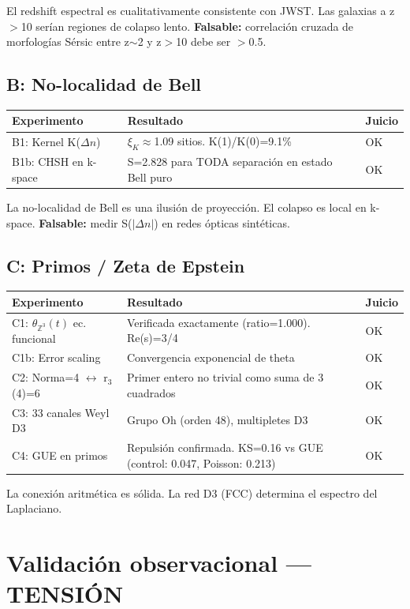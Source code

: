 \documentclass[12pt]{article}
\begin{document}
El redshift espectral es cualitativamente consistente con JWST. Las galaxias a z$>$10 serían regiones de colapso lento. \textbf{Falsable:} correlación cruzada de morfologías Sérsic entre z$\sim$2 y z$>$10 debe ser $>$0.5.

\subsection{B: No-localidad de Bell}

\begin{tabular}{lll}
\toprule
Experimento & Resultado & Juicio \\
\midrule
B1: Kernel K($\Delta n$) & $\xi_K\approx$1.09 sitios. K(1)/K(0)=9.1\% & OK \\
B1b: CHSH en k-space & S=2.828 para TODA separación en estado Bell puro & OK \\
\bottomrule
\end{tabular}

La no-localidad de Bell es una ilusión de proyección. El colapso es local en k-space.
\textbf{Falsable:} medir S($|\Delta n|$) en redes ópticas sintéticas.

\subsection{C: Primos / Zeta de Epstein}

\begin{tabular}{lll}
\toprule
Experimento & Resultado & Juicio \\
\midrule
C1: $\theta_{\mathbb{Z}^3}(t)$ ec. funcional & Verificada exactamente (ratio=1.000). Re(s)=3/4 & OK \\
C1b: Error scaling & Convergencia exponencial de theta & OK \\
C2: Norma=4 $\leftrightarrow$ r$_3$(4)=6 & Primer entero no trivial como suma de 3 cuadrados & OK \\
C3: 33 canales Weyl D3 & Grupo Oh (orden 48), multipletes D3 & OK \\
C4: GUE en primos & Repulsión confirmada. KS=0.16 vs GUE (control: 0.047, Poisson: 0.213) & OK \\
\bottomrule
\end{tabular}

La conexión aritmética es sólida. La red D3 (FCC) determina el espectro del Laplaciano.

\section{Validación observacional --- TENSIÓN}
\end{document}
